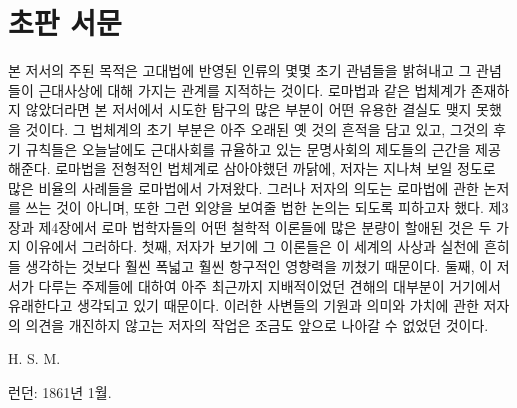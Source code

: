 \chapter{초판 서문}

본 저서의 주된 목적은
고대법에 반영된 인류의 몇몇 초기 관념들을 밝혀내고
그 관념들이 근대사상에 대해 가지는 관계를 지적하는 것이다.
로마법과 같은 법체계가 존재하지 않았더라면
본 저서에서 시도한 탐구의 많은 부분이 어떤 유용한 결실도
맺지 못했을 것이다.
그 법체계의
초기 부분은 아주 오래된 옛 것의 흔적을 담고 있고,
그것의 후기 규칙들은 오늘날에도 근대사회를 규율하고 있는
문명사회의 제도들의 근간을 제공해준다.
로마법을 전형적인 법체계로 삼아야했던 까닭에,
저자는 지나쳐 보일 정도로 많은 비율의 사례들을
로마법에서 가져왔다.
그러나 저자의 의도는 로마법에 관한 논저를 쓰는 것이 아니며,
또한 그런 외양을 보여줄 법한 논의는 되도록 피하고자 했다.
제3장과 제4장에서
로마 법학자들의 어떤 철학적 이론들에 많은 분량이 할애된 것은
두 가지 이유에서 그러하다.
첫째, 저자가 보기에 그 이론들은
이 세계의 사상과 실천에
흔히들 생각하는 것보다
훨씬 폭넓고 훨씬 항구적인 영향력을 끼쳤기 때문이다.
둘째, 이 저서가 다루는 주제들에 대하여
아주 최근까지 지배적이었던 견해의 대부분이
거기에서 유래한다고 생각되고 있기 때문이다.
이러한 사변들의 기원과 의미와 가치에 관한
저자의 의견을 개진하지 않고는
저자의 작업은 조금도 앞으로 나아갈 수 없었던 것이다.

\begin{flushright}
H. S. M.
\end{flushright}

\begin{footnotesize}
런던: 1861년 1월.
\end{footnotesize}

